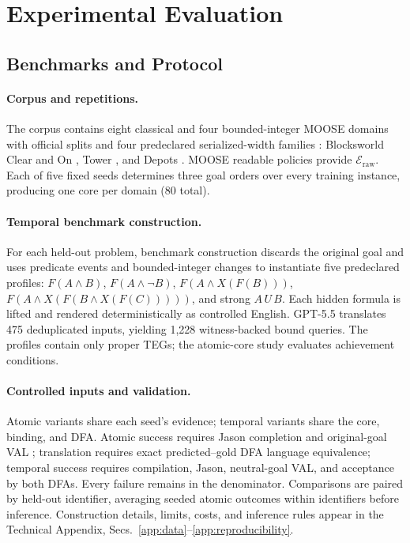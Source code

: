 \section{Experimental Evaluation}
\label{sec:evaluation}

\subsection{Benchmarks and Protocol}

\paragraph{Corpus and repetitions.}
The corpus contains eight classical and four bounded-integer MOOSE domains with
official splits \cite{Chen2026Moose,DillonZChenMooseDataset} and four
predeclared serialized-width families \cite{LipovetzkyGeffner2012Width}:
Blocksworld Clear and On
\cite{Frances2021LearningGeneralPolicies,BonetLearnerPoliciesRepository},
Tower \cite{Bacchus2001AIPS00,PotasscoPDDLInstances}, and Depots
\cite{Bonet2018Features,RLeapD2LRepository}. MOOSE readable policies provide
$\mathcal E_{\mathrm{raw}}$. Each of five fixed seeds determines
three goal orders over every training instance, producing one core per domain (80
total).

\paragraph{Temporal benchmark construction.}
For each held-out problem, benchmark construction discards the original goal and uses
predicate events and bounded-integer changes to instantiate five predeclared
profiles: $F(A\land B)$, $F(A\land\neg B)$,
$F(A\land X(F(B)))$,
$F(A\land X(F(B\land X(F(C)))))$, and strong $A\,U\,B$.
Each hidden formula is lifted and rendered deterministically as
controlled English. GPT-5.5 \cite{OpenAI2026GPT55SystemCard} translates 475
deduplicated inputs, yielding 1,228 witness-backed bound queries.
The profiles contain only proper TEGs; the atomic-core study evaluates
achievement conditions.

\paragraph{Controlled inputs and validation.}
Atomic variants share each seed's evidence; temporal variants share the core,
binding, and DFA. Atomic success requires Jason completion and original-goal
VAL \cite{Bordini2007Jason,Howey2004VAL}; translation requires exact predicted--gold
DFA language equivalence; temporal success requires compilation, Jason,
neutral-goal VAL, and acceptance by both DFAs. Every failure remains in the
denominator. Comparisons are paired by held-out identifier, averaging seeded
atomic outcomes within identifiers before inference. Construction details,
limits, costs, and inference rules appear in the Technical Appendix,
Secs.~\ref{app:data}--\ref{app:reproducibility}.

